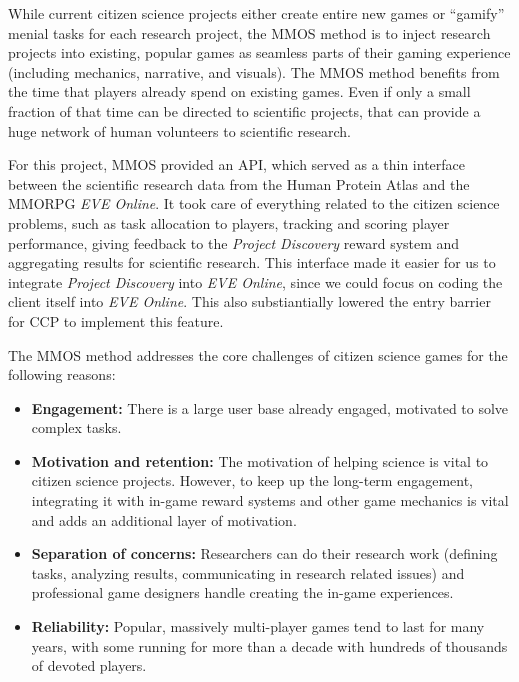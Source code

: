 While current citizen science projects either create entire new games or ``gamify'' menial tasks for each research project, the MMOS method is to inject research projects into existing, popular games as seamless parts of their gaming experience (including mechanics, narrative, and visuals). The MMOS method benefits from the time that players already spend on existing games. Even if only a small fraction of that time can be directed to scientific projects, that can provide a huge network of human volunteers to scientific research.

For this project, MMOS provided an API, which served as a thin interface between the scientific research data from the Human Protein Atlas and the MMORPG \emph{EVE Online}. It took care of everything related to the citizen science problems, such as task allocation to players, tracking and scoring player performance, giving feedback to the \emph{Project Discovery} reward system and aggregating results for scientific research. This interface made it easier for us to integrate \emph{Project Discovery} into \emph{EVE Online}, since we could focus on coding the client itself into \emph{EVE Online}. This also substiantially lowered the entry barrier for CCP to implement this feature.

The MMOS method addresses the core challenges of citizen science games for the following reasons:

\begin{itemize}
\item {\bf Engagement:} There is a large user base already engaged, motivated to solve complex tasks.

\item {\bf Motivation and retention:} The motivation of helping 
science is vital to citizen science projects. However, to keep up the long-term engagement, integrating it with in-game reward systems and other game mechanics is vital and adds an additional layer of motivation.

\item {\bf Separation of concerns:} Researchers can do their research work (defining tasks, analyzing results, communicating in research related issues) and professional game designers handle creating the in-game experiences.

\item {\bf Reliability:} Popular, massively multi-player games tend to last for many years, with some running for more than a decade with hundreds of thousands of devoted players.
\end{itemize}

